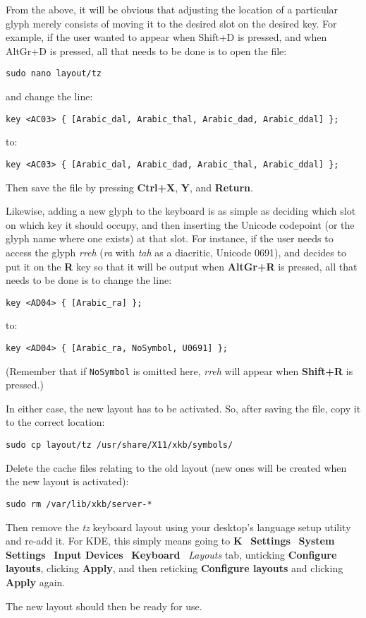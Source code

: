From the above, it will be obvious that adjusting the location of a particular glyph merely consists of moving it to the desired slot on the desired key.  For example, if the user wanted  to appear when Shift+D is pressed, and  when AltGr+D is pressed, all that needs to be done is to open the file:

\verb|sudo nano layout/tz|

and change the line:

\verb|key <AC03> { [Arabic_dal, Arabic_thal, Arabic_dad, Arabic_ddal] };|

to:

\verb|key <AC03> { [Arabic_dal, Arabic_dad, Arabic_thal, Arabic_ddal] };|

Then save the file by pressing \textbf{Ctrl+X}, \textbf{Y}, and \textbf{Return}.

Likewise, adding a new glyph to the keyboard is as simple as deciding which slot on which key it should occupy, and then inserting the Unicode codepoint (or the glyph name where one exists) at that slot.  For instance, if the user needs to access the glyph \textit{rreh} (\textit{ra} with \textit{tah} as a diacritic, Unicode 0691), and decides to put it on the \textbf{R} key so that it will be output when \textbf{AltGr+R} is pressed, all that needs to be done is to change the line:

\verb|key <AD04> { [Arabic_ra] };|

to:

\verb|key <AD04> { [Arabic_ra, NoSymbol, U0691] };|

(Remember that if \verb|NoSymbol| is omitted here, \textit{rreh} will appear when \textbf{Shift+R} is pressed.)

In either case, the new layout has to be activated.  So, after saving the file, copy it to the correct location:

\verb|sudo cp layout/tz /usr/share/X11/xkb/symbols/|

Delete the cache files relating to the old layout (new ones will be created when the new layout is activated):

\verb|sudo rm /var/lib/xkb/server-*|

Then remove the \textit{tz} keyboard layout using your desktop's language setup utility and re-add it.  For KDE, this simply means going to \textbf{K} \textrightarrow\ \textbf{Settings} \textrightarrow\ \textbf{System Settings} \textrightarrow\ \textbf{Input Devices} \textrightarrow\ \textbf{Keyboard} \textrightarrow\ \textit{Layouts} tab, unticking \textbf{Configure layouts}, clicking \textbf{Apply}, and then reticking \textbf{Configure layouts} and clicking \textbf{Apply} again.

The new layout should then be ready for use.
